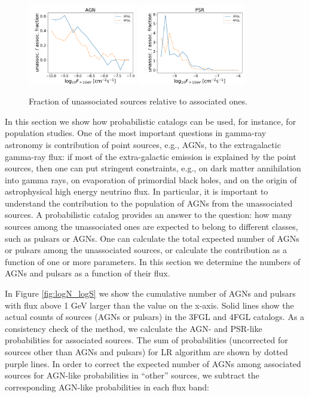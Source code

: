 \begin{figure}[h]
\center
\includegraphics[width=0.42\textwidth]{plots/logN_logS_diff_AGN_unweighted.pdf}
\includegraphics[width=0.42\textwidth]{plots/logN_logS_diff_PSR_unweighted.pdf}
\caption{Fraction of unassociated sources relative to associated ones.}  
\label{fig:unass_vs_ass_frac}
\end{figure}



In this section we show how probabilistic catalogs can be used, for instance, for population studies.
One of the most important questions in gamma-ray astronomy is contribution of point sources, e.g., AGNs, to the extragalactic gamma-ray
flux:
if most of the extra-galactic emission is explained by the point sources, then one can put stringent constraints, e.g., on 
dark matter annihilation into gamma rays, on evaporation of primordial black holes, and on the origin of astrophysical high energy neutrino flux.
In particular, it is important to understand the contribution to the population of AGNs from the unassociated sources.
A probabilistic catalog provides an answer to the question: how many sources among the unassociated ones are expected to belong to different classes, such as pulsars or AGNs. 
One can calculate the total expected number of AGNs or pulsars among the unassociated sources, or calculate the contribution as a function of one or more parameters.
In this section we determine the numbers of AGNs and pulsars as a function of their flux.

In Figure \ref{fig:logN_logS} we show the cumulative number of AGNs and pulsars with flux above 1 GeV larger than the
value on the x-axis.
Solid lines show the actual counts of sources (AGNs or pulsars) in the 3FGL and 4FGL catalogs.
As a consistency check of the method, we calculate the AGN- and PSR-like probabilities for associated sources.
The sum of probabilities (uncorrected for sources other than AGNs and pulsars) for LR algorithm are shown by dotted purple lines.
In order to correct the expected number of AGNs among associated sources for AGN-like probabilities in ``other'' sources, 
we subtract the corresponding AGN-like probabilities in each flux band:


